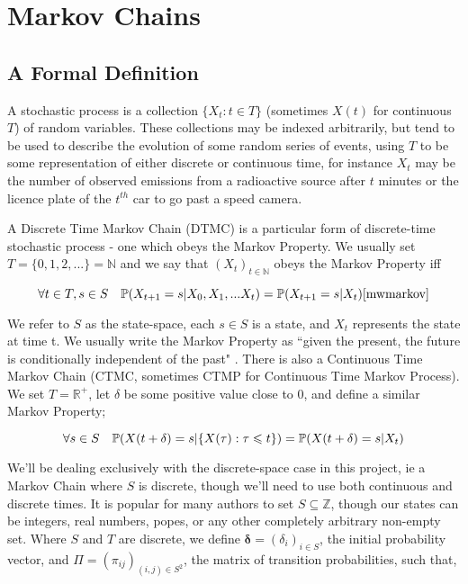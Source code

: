 \section{Markov Chains}

\subsection{A Formal Definition}

A stochastic process \cite[p590]{doob96} is a collection $\{X_t : t \in T\}$ (sometimes $X(t)$ for continuous $T$) of random variables. These collections may be indexed arbitrarily, but tend to be used to describe the evolution of some random series of events, using $T$ to be some representation of either discrete or continuous time, for instance $X_t$ may be the number of observed emissions from a radioactive source after $t$ minutes or the licence plate of the $t^{th}$ car to go past a speed camera.

A Discrete Time Markov Chain (DTMC) is a particular form of discrete-time stochastic process - one which obeys the Markov Property. We usually set $T=\{0,1,2,...\}=\mathbb{N}$ and we say that $(X_t)_{t \in \mathbb{N}}$ obeys the Markov Property iff

$$
\forall t \in T, s \in S \quad \mathbb{P} (X_{t+1} = s | X_0, X_1, ... X_t) = \mathbb{P} (X_{t+1} = s | X_t)\cite{mwmarkov}
$$

We refer to $S$ as the state-space, each $s \in S$ is a state, and $X_t$ represents the state at time t. We usually write the Markov Property as ``given the present, the future is conditionally independent of the past" \cite{mwmarkov}.
There is also a Continuous Time Markov Chain (CTMC, sometimes CTMP for Continuous Time Markov Process). We set $T=\mathbb{R}^{+}$, let $\delta$ be some positive value close to 0, and define a similar Markov Property;

$$
\forall s \in S \quad \mathbb{P} (X(t+\delta) = s | \{X(\tau) : \tau \leqslant t\}) = \mathbb{P} (X(t+\delta) = s | X_t)
$$

We'll be dealing exclusively with the discrete-space case in this project, ie a Markov Chain where $S$ is discrete, though we'll need to use both continuous and discrete times. It is popular for many authors to set $S \subseteq \mathbb{Z}$, though our states can be integers, real numbers, popes, or any other completely arbitrary non-empty set. Where $S$ and $T$ are discrete, we define $\mathbf{\delta} = (\delta_i)_{i \in S}$, the initial probability vector, and $\Pi = (\pi_{ij})_{(i,j) \in S^2}$, the matrix of transition probabilities, such that,


